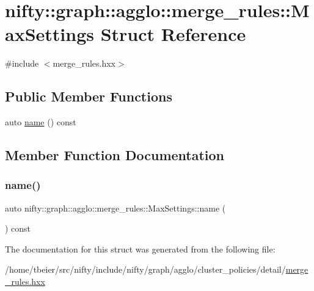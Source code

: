 \hypertarget{structnifty_1_1graph_1_1agglo_1_1merge__rules_1_1MaxSettings}{}\section{nifty\+:\+:graph\+:\+:agglo\+:\+:merge\+\_\+rules\+:\+:Max\+Settings Struct Reference}
\label{structnifty_1_1graph_1_1agglo_1_1merge__rules_1_1MaxSettings}


{\ttfamily \#include $<$merge\+\_\+rules.\+hxx$>$}

\subsection*{Public Member Functions}
\begin{DoxyCompactItemize}
\item 
auto \hyperlink{structnifty_1_1graph_1_1agglo_1_1merge__rules_1_1MaxSettings_af632e0160dc542a807e4e67b7133f57f}{name} () const
\end{DoxyCompactItemize}


\subsection{Member Function Documentation}
\mbox{\label{structnifty_1_1graph_1_1agglo_1_1merge__rules_1_1MaxSettings_af632e0160dc542a807e4e67b7133f57f}} 
\subsubsection{\texorpdfstring{name()}{name()}}
{\footnotesize\ttfamily auto nifty\+::graph\+::agglo\+::merge\+\_\+rules\+::\+Max\+Settings\+::name (\begin{DoxyParamCaption}{ }\end{DoxyParamCaption}) const\hspace{0.3cm}{\ttfamily [inline]}}



The documentation for this struct was generated from the following file\+:\begin{DoxyCompactItemize}
\item 
/home/tbeier/src/nifty/include/nifty/graph/agglo/cluster\+\_\+policies/detail/\hyperlink{merge__rules_8hxx}{merge\+\_\+rules.\+hxx}\end{DoxyCompactItemize}
